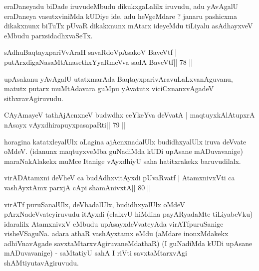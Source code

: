 \begin{artha}
eraDaneyadu biDade iruvudeMbudu dikukxgaLalilx iruvudu, adu yAvAgalU eraDaneya vasutxviniMda kUDiye ide. adu heVgeMdare ? janaru pashicxma dikakxnunx biTuTx pUvaR dikakxnunx mAtarx ideyeMdu tiLiyalu asAdhayxveV eMbudu parxsidadhxvaSeTx.
\end{artha}


\begin{shl}
sAdhuBaqtayxpariVvAraH savaRdoVpAsakoV BaveVtf |
putArxdigaNasaMtAnasethxYyaRmeVva sadA BaveVtf\hfill || 78 ||
\end{shl}

\begin{artha}
upAsakanu yAvAgalU utatxmarAda BaqtayxparivAravuLaLxvanAguvanu, matutx putarx muMtAdavara guMpu yAvatutx viciCxnanxvAgadeV sithxravAgiruvudu.
\end{artha} 


\begin{shl}
CAyAmayeV tathA\s jAcnxneV budwdhx ceYkeYva deVvatA |
maqtuyxkAlAtupxrA nAsayx vAyxdhirapuyxpasapaRti\hfill || 79 ||
\end{shl}

\begin{artha}
horagina katatxleyalUlx oLagina ajAcnxnadalUlx budidhxyalUlx iruva  deVvate oMdeV. (idanunx maqtuyxveMba guNadiMda kUDi upAsane mADuvavanige) maraNakAlakekx muMce Itanige vAyxdhiyU saha hatitxrakekx baruvudilalx.
\end{artha}


\begin{shl}
virADAtamxni deVheV ca budAdhxvitAyxdi pUvaRvatf |
AtamxnivxVti ca vashAyxtAmx parxjA cApi shamAnivxtA\hfill || 80 ||
\end{shl}

\begin{artha}
virATf puruSanalUlx, deVhadalUlx, budidhxyalUlx oMdeV  pArxNadeVvateyiru\-vudu itAyxdi (elalxvU hiMdina payARyadaMte  tiLiyabeVku) idaralilx AtamxnivxV eMbudu upAsayxdeVvateyAda  virATfpuruSanige visheVSaguNa. adara athaR vashAyxtamx eMdu (aMdare  inonxMdakekx adhiVnavAgade savxtaMtarxvAgiruvaneMdathaR) (I guNadiMda kUDi upAsane mADuvavanige) - saMtatiyU sahA I riVti savxtaMtarxvAgi shAMtiyutavAgiruvudu.
\end{artha}

